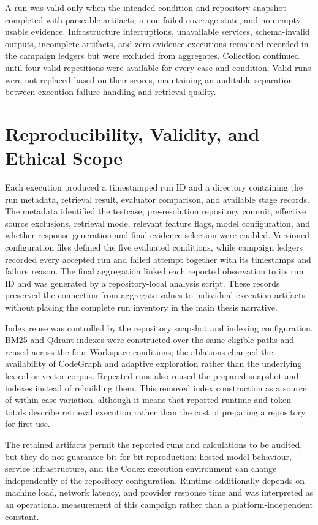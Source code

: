 A run was valid only when the intended condition and repository snapshot completed with parseable artifacts, a non-failed coverage state, and non-empty usable evidence. Infrastructure interruptions, unavailable services, schema-invalid outputs, incomplete artifacts, and zero-evidence executions remained recorded in the campaign ledgers but were excluded from aggregates. Collection continued until four valid repetitions were available for every case and condition. Valid runs were not replaced based on their scores, maintaining an auditable separation between execution failure handling and retrieval quality.

\section{Reproducibility, Validity, and Ethical Scope}\label{sec:reproducibility-validity-and-ethical-scope}

Each execution produced a timestamped run ID and a directory containing the run metadata, retrieval result, evaluator comparison, and available stage records. The metadata identified the testcase, pre-resolution repository commit, effective source exclusions, retrieval mode, relevant feature flags, model configuration, and whether response generation and final evidence selection were enabled. Versioned configuration files defined the five evaluated conditions, while campaign ledgers recorded every accepted run and failed attempt together with its timestamps and failure reason. The final aggregation linked each reported observation to its run ID and was generated by a repository-local analysis script. These records preserved the connection from aggregate values to individual execution artifacts without placing the complete run inventory in the main thesis narrative.

Index reuse was controlled by the repository snapshot and indexing configuration. BM25 and Qdrant indexes were constructed over the same eligible paths and reused across the four Workspace conditions; the ablations changed the availability of CodeGraph and adaptive exploration rather than the underlying lexical or vector corpus. Repeated runs also reused the prepared snapshot and indexes instead of rebuilding them. This removed index construction as a source of within-case variation, although it means that reported runtime and token totals describe retrieval execution rather than the cost of preparing a repository for first use.

The retained artifacts permit the reported runs and calculations to be audited, but they do not guarantee bit-for-bit reproduction: hosted model behaviour, service infrastructure, and the Codex execution environment can change independently of the repository configuration. Runtime additionally depends on machine load, network latency, and provider response time and was interpreted as an operational measurement of this campaign rather than a platform-independent constant.

